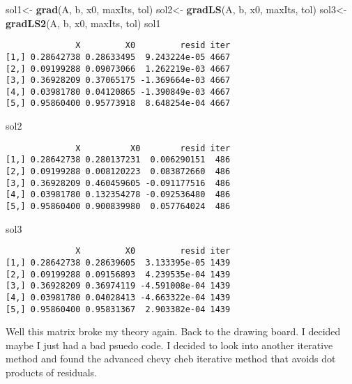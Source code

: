 \documentclass[]{article}
\newenvironment{Shaded}{\begin{snugshade}}{\end{snugshade}}
\newcommand{\KeywordTok}[1]{\textcolor[rgb]{0.13,0.29,0.53}{\textbf{#1}}}
\newcommand{\StringTok}[1]{\textcolor[rgb]{0.31,0.60,0.02}{#1}}
\newcommand{\NormalTok}[1]{#1}
\begin{document}
\begin{Shaded}
\begin{Highlighting}[]
\NormalTok{sol1<-}\StringTok{ }\KeywordTok{grad}\NormalTok{(A, b, x0, maxIts, tol)}
\NormalTok{sol2<-}\StringTok{ }\KeywordTok{gradLS}\NormalTok{(A, b, x0, maxIts, tol)}
\NormalTok{sol3<-}\StringTok{ }\KeywordTok{gradLS2}\NormalTok{(A, b, x0, maxIts, tol)}
\NormalTok{sol1}
\end{Highlighting}
\end{Shaded}

\begin{verbatim}
              X         X0         resid iter
[1,] 0.28642738 0.28633495  9.243224e-05 4667
[2,] 0.09199288 0.09073066  1.262219e-03 4667
[3,] 0.36928209 0.37065175 -1.369664e-03 4667
[4,] 0.03981780 0.04120865 -1.390849e-03 4667
[5,] 0.95860400 0.95773918  8.648254e-04 4667
\end{verbatim}

\begin{Shaded}
\begin{Highlighting}[]
\NormalTok{sol2}
\end{Highlighting}
\end{Shaded}

\begin{verbatim}
              X          X0        resid iter
[1,] 0.28642738 0.280137231  0.006290151  486
[2,] 0.09199288 0.008120223  0.083872660  486
[3,] 0.36928209 0.460459605 -0.091177516  486
[4,] 0.03981780 0.132354278 -0.092536480  486
[5,] 0.95860400 0.900839980  0.057764024  486
\end{verbatim}

\begin{Shaded}
\begin{Highlighting}[]
\NormalTok{sol3}
\end{Highlighting}
\end{Shaded}

\begin{verbatim}
              X         X0         resid iter
[1,] 0.28642738 0.28639605  3.133395e-05 1439
[2,] 0.09199288 0.09156893  4.239535e-04 1439
[3,] 0.36928209 0.36974119 -4.591008e-04 1439
[4,] 0.03981780 0.04028413 -4.663322e-04 1439
[5,] 0.95860400 0.95831367  2.903382e-04 1439
\end{verbatim}

Well this matrix broke my theory again. Back to the drawing board. I
decided maybe I just had a bad psuedo code. I decided to look into
another iterative method and found the advanced chevy cheb iterative
method that avoids dot products of residuals.
\end{document}
